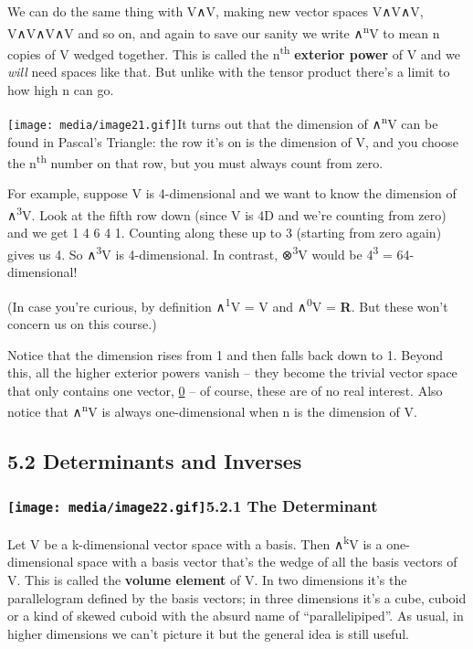 \documentclass[oneside,english]{amsbook}
\numberwithin{section}{chapter}
\theoremstyle{plain}
\theoremstyle{definition}
\begin{document}
We can do the same thing with V∧V, making new vector spaces V∧V∧V,
V∧V∧V∧V and so on, and again to save our sanity we write
∧\textsuperscript{n}V to mean n copies of V wedged together. This is
called the n\textsuperscript{th} \textbf{exterior power} of V and we
\emph{will} need spaces like that. But unlike with the tensor product
there's a limit to how high n can go.

\texttt{[image: media/image21.gif]}It
turns out that the dimension of ∧\textsuperscript{n}V can be found in
Pascal's Triangle: the row it's on is the dimension of V, and you choose
the n\textsuperscript{th} number on that row, but you must always count
from zero.

For example, suppose V is 4-dimensional and we want to know the
dimension of ∧\textsuperscript{3}V. Look at the fifth row down (since V
is 4D and we're counting from zero) and we get 1 4 6 4 1. Counting along
these up to 3 (starting from zero again) gives us 4. So
∧\textsuperscript{3}V is 4-dimensional. In contrast,
⊗\textsuperscript{3}V would be 4\textsuperscript{3} = 64-dimensional!

(In case you're curious, by definition ∧\textsuperscript{1}V = V and
∧\textsuperscript{0}V = \textbf{R}. But these won't concern us on this
course.)

Notice that the dimension rises from 1 and then falls back down to 1.
Beyond this, all the higher exterior powers vanish -- they become the
trivial vector space that only contains one vector, \ul{0} -- of course,
these are of no real interest. Also notice that ∧\textsuperscript{n}V is
always one-dimensional when n is the dimension of V.

\subsection{5.2 Determinants and
	Inverses}\label{determinants-and-inverses}

\subsubsection[5.2.1 The
Determinant]{\texorpdfstring{\protect\texttt{[image: media/image22.gif]}5.2.1
		The
		Determinant}{The Parallelepiped5.2.1 The Determinant}}\label{the-parallelepiped5.2.1-the-determinant}

Let V be a k-dimensional vector space with a basis. Then
∧\textsuperscript{k}V is a one-dimensional space with a basis vector
that's the wedge of all the basis vectors of V. This is called the
\textbf{volume element} of V. In two dimensions it's the parallelogram
defined by the basis vectors; in three dimensions it's a cube, cuboid or
a kind of skewed cuboid with the absurd name of ``parallelipiped''. As
usual, in higher dimensions we can't picture it but the general idea is
still useful.
\end{document}
